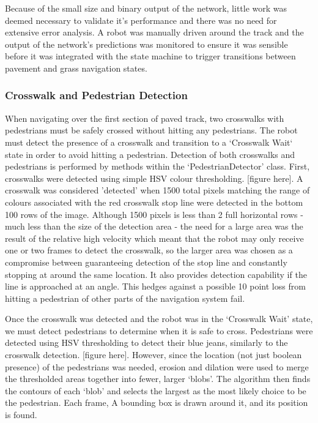 \documentclass[titlepage, twocolumn]{article}
\begin{document}
            Because of the small size and binary output of the network, little work was deemed necessary to validate it's performance and there was no need for extensive error analysis. A robot was manually driven around the track and the output of the network's predictions was monitored to ensure it was sensible before it was integrated with the state machine to trigger transitions between pavement and grass navigation states.

        \subsubsection{Crosswalk and Pedestrian Detection}
            When navigating over the first section of paved track, two crosswalks with pedestrians must be safely crossed without hitting any pedestrians. The robot must detect the presence of a crosswalk and transition to a `Crosswalk Wait` state in order to avoid hitting a pedestrian. Detection of both crosswalks and pedestrians is performed by methods within the `PedestrianDetector' class. First, crosswalks were detected using simple HSV colour thresholding. [figure here]. A crosswalk was considered 'detected' when 1500 total pixels matching the range of colours associated with the red crosswalk stop line were detected in the bottom 100 rows of the image. Although 1500 pixels is less than 2 full horizontal rows - much less than the size of the detection area - the need for a large area was the result of the relative high velocity which meant that the robot may only receive one or two frames to detect the crosswalk, so the larger area was chosen as a compromise between guaranteeing detection of the stop line and constantly stopping at around the same location. It also provides detection capability if the line is approached at an angle. This hedges against a possible 10 point loss from hitting a pedestrian of other parts of the navigation system fail.

            Once the crosswalk was detected and the robot was in the `Crosswalk Wait' state, we must detect pedestrians to determine when it is safe to cross. Pedestrians were detected using HSV thresholding to detect their blue jeans, similarly to the crosswalk detection. [figure here]. However, since the location (not just boolean presence) of the pedestrians was needed, erosion and dilation were used to merge the thresholded areas together into fewer, larger `blobs'. The algorithm then finds the contours of each `blob' and selects the largest as the most likely choice to be the pedestrian. Each frame, A bounding box is drawn around it, and its position is found.
\end{document}
